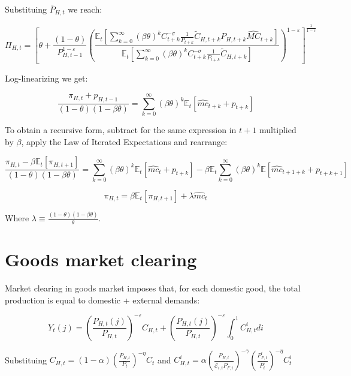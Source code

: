 \documentclass{article}
\newcommand{\Et}{\mathbb{E}_t}
\begin{document}
Substituing $\bar P_{H,t}$ we reach:

\begin{equation}
    \Pi_{H,t} = \left[ \theta + \frac{(1-\theta)}{P_{H,t-1}^{1-\varepsilon}} \left(\frac{\Et\left[ \sum^\infty_{k=0} (\beta\theta)^k C_{t+k}^{-\sigma} \frac{1}{P_{t+k}}\tilde C_{H,t+k} P_{H,t+k} \widehat{MC}_{t+k}\right] }{\Et\left[ \sum^\infty_{k=0} (\beta\theta)^k C_{t+k}^{-\sigma} \frac{1}{P_{t+k}} \tilde C_{H,t+k}  \right]} \right)^{1-\varepsilon}\right]^\frac{1}{1-\varepsilon}
\end{equation}


Log-linearizing we get:

\begin{equation}
    \frac{\pi_{H,t} + p_{H,t-1}}{(1-\theta)(1-\beta \theta) } = \sum^\infty_{k=0} (\beta \theta)^k \Et[\hat{mc}_{t+k} + p_{t+k}] 
\end{equation}

To obtain a recursive form, subtract for the same expression in $t+1$ multiplied by $\beta$, apply the Law of Iterated Expectations and rearrange:

\begin{equation}
    \frac{\pi_{H,t} - \beta \Et[\pi_{H,t+1}]}{(1-\theta)(1-\beta \theta) } = \sum^\infty_{k=0} (\beta \theta)^k \Et[\hat{mc}_t + p_{t+k}]  - \beta \Et \sum^\infty_{k=0} (\beta \theta)^k  \mathbb E[\hat{mc}_{t+1+k} + p_{t+k+1}] 
\end{equation}


\begin{equation}
    \pi_{H,t} = \beta \Et[\pi_{H,t+1}] + \lambda \hat{mc}_t
\end{equation}

Where $\lambda \equiv \frac{(1-\theta) (1 - \beta \theta)}{\theta}$.

\section{Goods market clearing}
Market clearing in goods market imposes that, for each domestic good, the total production is equal to domestic + external demands:

\begin{equation}
    Y_{t}(j) = \left( \frac{P_{H,t}(j)}{P_{H,t}} \right)^{-\varepsilon} C_{H,t} + \left( \frac{P_{H,t}(j)}{P_{H,t}} \right)^{-\varepsilon} \int_0^1 C^i_{H, t} di
\end{equation}

Substituing $C_{H,t} = (1-\alpha) \left( \frac{P_{H,t}}{P_t} \right)^{-\eta} C_t$ and $C^i_{H,t} = \alpha \left( \frac{P_{H,t}}{\mathcal{E}_{i,t} P^i_{F,t}} \right)^{-\gamma} \left( \frac{P^i_{F,t}}{P^i_{t}} \right)^{-\eta} C^i_t$
\end{document}
